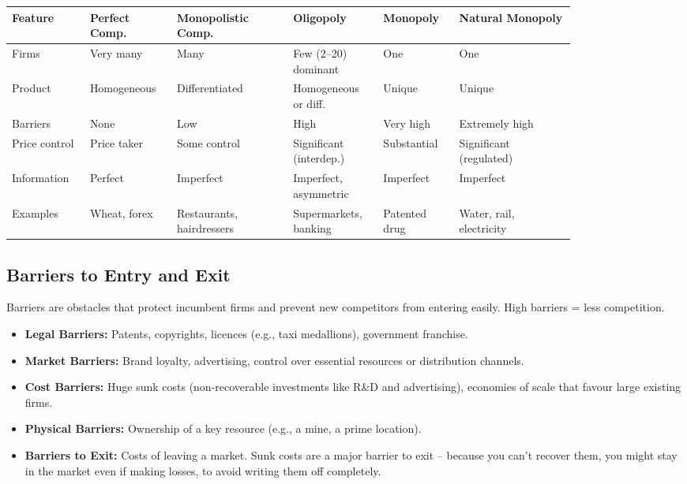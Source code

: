 \documentclass[11pt, a4paper, twoside]{book}
\begin{document}
\begin{example}
\scriptsize
\begin{tabular}{@{}>{\RaggedRight\arraybackslash}p{0.12\linewidth}>{\RaggedRight\arraybackslash}p{0.12\linewidth}>{\RaggedRight\arraybackslash}p{0.18\linewidth}>{\RaggedRight\arraybackslash}p{0.12\linewidth}>{\RaggedRight\arraybackslash}p{0.11\linewidth}>{\RaggedRight\arraybackslash}p{0.18\linewidth}@{}}
\textbf{Feature} & \textbf{Perfect Comp.} & \textbf{Monopolistic Comp.} & \textbf{Oligopoly} & \textbf{Monopoly} & \textbf{Natural Monopoly} \\
\midrule
Firms & Very many & Many & Few (2--20) dominant & One & One \\
Product & Homogeneous & Differentiated & Homogeneous or diff. & Unique & Unique \\
Barriers & None & Low & High & Very high & Extremely high \\
Price control & Price taker & Some control & Significant (interdep.) & Substantial & Significant (regulated) \\
Information & Perfect & Imperfect & Imperfect, asymmetric & Imperfect & Imperfect \\
Examples & Wheat, forex & Restaurants, hairdressers & Supermarkets, banking & Patented drug & Water, rail, electricity \\
\end{tabular}
\normalsize
\end{example}

\subsection{Barriers to Entry and Exit}

Barriers are obstacles that protect incumbent firms and prevent new competitors from entering easily. High barriers = less competition.

\begin{itemize}
  \item \textbf{Legal Barriers:} Patents, copyrights, licences (e.g., taxi medallions), government franchise.
  \item \textbf{Market Barriers:} Brand loyalty, advertising, control over essential resources or distribution channels.
  \item \textbf{Cost Barriers:} Huge sunk costs (non-recoverable investments like R\&D and advertising), economies of scale that favour large existing firms.
  \item \textbf{Physical Barriers:} Ownership of a key resource (e.g., a mine, a prime location).
  \item \textbf{Barriers to Exit:} Costs of leaving a market. Sunk costs are a major barrier to exit -- because you can't recover them, you might stay in the market even if making losses, to avoid writing them off completely.
\end{itemize}
\end{document}

